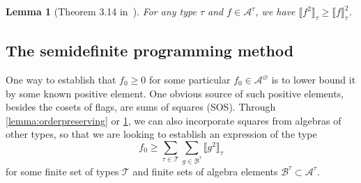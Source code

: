 \documentclass[a4paper,11pt]{article}
\newtheorem{lemma}[theorem]{Lemma}
\numberwithin{equation}{section}
\newcommand{\mA}{\mathcal{A}}
\newcommand{\mB}{\mathcal{B}}
\newcommand{\mF}{\mathcal{F}}
\newcommand{\mT}{\mathcal{T}}
\begin{document}
%
\begin{lemma}[Theorem 3.14 in~\cite{Razborov_2007}] \label{lemma:cauchyschwarz}
    For any type $\tau$ and $f \in \mA^\tau$, we have $\llbracket f^2 \rrbracket_\tau \geq \llbracket f \rrbracket_\tau^2$.
\end{lemma}

\subsection{The semidefinite programming method}

One way to establish that $f_0 \geq 0$ for some particular $f_0 \in \mA^\varnothing$
is to lower bound it by some known positive element. One obvious source of such positive elements, besides the cosets of flags, are sums of squares (SOS). Through \cref{lemma:orderpreserving} or \cref{lemma:cauchyschwarz}, we can also incorporate squares from algebras of other types, so that we are looking to establish an expression of the type
%
\begin{equation} \label{eq:basic-sos}
    f_0 \geq \sum_{\tau \in \mT} \sum_{g \in \mB^\tau} \llbracket g^2 \rrbracket_\tau
\end{equation}
%
for some finite set of types $\mT$ and finite sets of algebra elements $\mB^\tau \subset \mA^\tau$.
\end{document}
